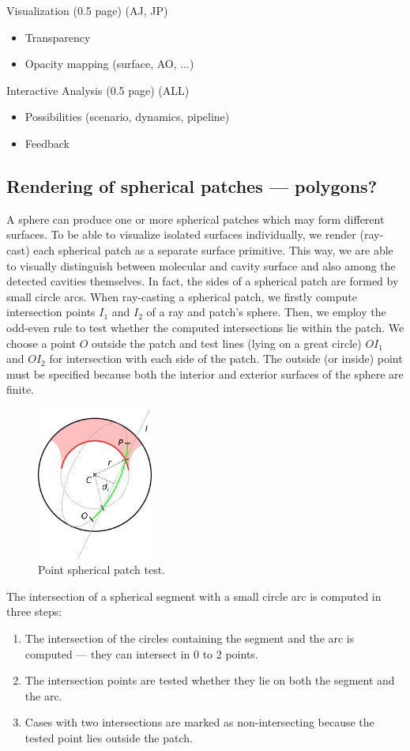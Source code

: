 Visualization (0.5 page) (AJ, JP)
\begin{itemize}
  \item Transparency
	\item Opacity mapping (surface, AO, ...)
\end{itemize}

Interactive Analysis (0.5 page) (ALL)
\begin{itemize}
  \item Possibilities (scenario, dynamics, pipeline)
  \item Feedback
\end{itemize}

\subsection{Rendering of spherical patches --- polygons?}
A sphere can produce one or more spherical patches which may form different surfaces.
To be able to visualize isolated surfaces individually, we render (ray-cast) each spherical patch as a separate surface primitive.
This way, we are able to visually distinguish between molecular and cavity surface and also among the detected cavities themselves.
In fact, the sides of a spherical patch are formed by small circle arcs.
When ray-casting a spherical patch, we firstly compute intersection points $I_1$ and $I_2$ of a ray and patch's sphere.
Then, we employ the odd-even rule to test whether the computed intersections lie within the patch.
We choose a point $O$ outside the patch and test lines (lying on a great circle) $OI_1$ and $OI_2$ for intersection with each side of the patch.
The outside (or inside) point must be specified because both the interior and exterior surfaces of the sphere are finite.

\begin{figure}[htb]
  \centering
  \includegraphics[width=1.5in]{image/patch.png}
  \caption{Point spherical patch test.}
\end{figure}

The intersection of a spherical segment with a small circle arc is computed in three steps:
\begin{enumerate}
  \item The intersection of the circles containing the segment and the arc is computed --- they can intersect in 0 to 2 points.
  \item The intersection points are tested whether they lie on both the segment and the arc.
  \item Cases with two intersections are marked as non-intersecting because the tested point lies outside the patch.
\end{enumerate}

